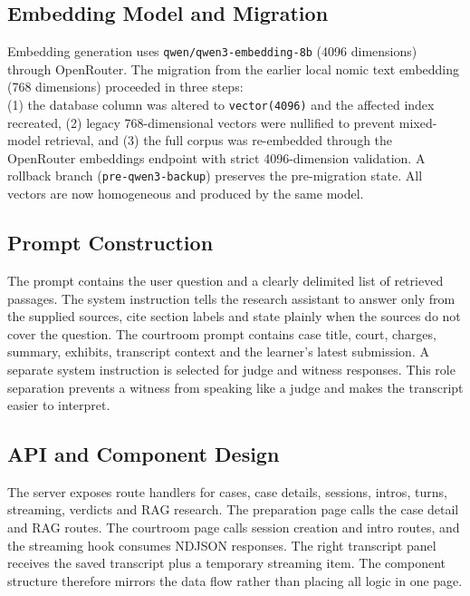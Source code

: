 \documentclass[12pt]{article}
\begin{document}
\subsection{Embedding Model and Migration}
Embedding generation uses \texttt{qwen/qwen3-embedding-8b} (4096 dimensions) through OpenRouter. The migration from the earlier local nomic text embedding (768 dimensions) proceeded in three steps:\\
(1) the database column was altered to \texttt{vector(4096)} and the affected index recreated, (2) legacy 768-dimensional vectors were nullified to prevent mixed-model retrieval, and (3) the full corpus was re-embedded through the OpenRouter embeddings endpoint with strict 4096-dimension validation. A rollback branch (\texttt{pre-qwen3-backup}) preserves the pre-migration state. All vectors are now homogeneous and produced by the same model.


\subsection{Prompt Construction}
The prompt contains the user question and a clearly delimited list of retrieved passages. The system instruction tells the research assistant to answer only from the supplied sources, cite section labels and state plainly when the sources do not cover the question. The courtroom prompt contains case title, court, charges, summary, exhibits, transcript context and the learner's latest submission. A separate system instruction is selected for judge and witness responses. This role separation prevents a witness from speaking like a judge and makes the transcript easier to interpret.

\subsection{API and Component Design}
The server exposes route handlers for cases, case details, sessions, intros, turns, streaming, verdicts and RAG research. The preparation page calls the case detail and RAG routes. The courtroom page calls session creation and intro routes, and the streaming hook consumes NDJSON responses. The right transcript panel receives the saved transcript plus a temporary streaming item. The component structure therefore mirrors the data flow rather than placing all logic in one page.
\end{document}
